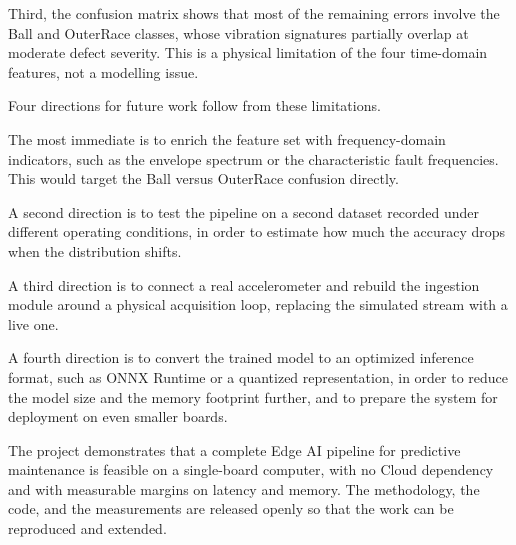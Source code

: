 Third, the confusion matrix shows that most of the remaining errors involve the Ball and OuterRace classes, whose vibration signatures partially overlap at moderate defect severity. This is a physical limitation of the four time-domain features, not a modelling issue.

Four directions for future work follow from these limitations.

The most immediate is to enrich the feature set with frequency-domain indicators, such as the envelope spectrum or the characteristic fault frequencies. This would target the Ball versus OuterRace confusion directly.

A second direction is to test the pipeline on a second dataset recorded under different operating conditions, in order to estimate how much the accuracy drops when the distribution shifts.

A third direction is to connect a real accelerometer and rebuild the ingestion module around a physical acquisition loop, replacing the simulated stream with a live one.

A fourth direction is to convert the trained model to an optimized inference format, such as ONNX Runtime or a quantized representation, in order to reduce the model size and the memory footprint further, and to prepare the system for deployment on even smaller boards.

The project demonstrates that a complete Edge AI pipeline for predictive maintenance is feasible on a single-board computer, with no Cloud dependency and with measurable margins on latency and memory. The methodology, the code, and the measurements are released openly so that the work can be reproduced and extended.
